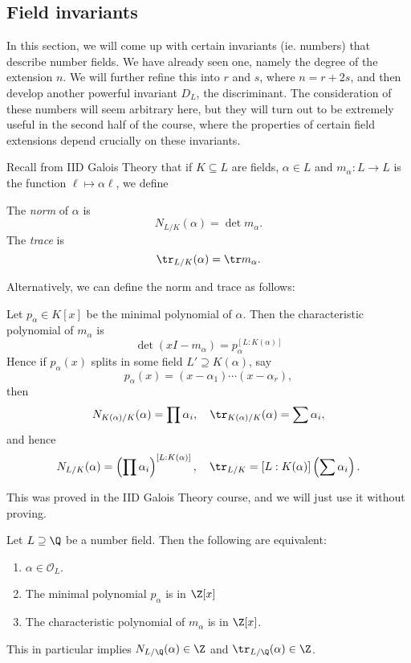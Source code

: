 \documentclass[a4paper]{article}
\begin{document}
\subsection{Field invariants}
In this section, we will come up with certain invariants (ie. numbers) that describe number fields. We have already seen one, namely the degree of the extension $n$. We will further refine this into $r$ and $s$, where $n = r + 2s$, and then develop another powerful invariant $D_L$, the discriminant. The consideration of these numbers will seem arbitrary here, but they will turn out to be extremely useful in the second half of the course, where the properties of certain field extensions depend crucially on these invariants.

Recall from IID Galois Theory that if $K \subseteq L$ are fields, $\alpha \in L$ and $m_\alpha: L \to L$ is the function $\ell \mapsto \alpha \ell$, we define
\begin{defi}
  The \emph{norm} of $\alpha$ is
  \[
    N_{L/K}(\alpha) = \det m_\alpha.
  \]
  The \emph{trace} is
  \[
    \tr_{L/K}(\alpha) = \tr m_\alpha.
  \]
\end{defi}

Alternatively, we can define the norm and trace as follows:
\begin{prop}
  Let $p_\alpha \in K[x]$ be the minimal polynomial of $\alpha$. Then the characteristic polynomial of $m_\alpha$ is
  \[
    \det(xI - m_\alpha) = p_\alpha^{[L:K(\alpha)]}
  \]
  Hence if $p_\alpha(x)$ splits in some field $L'\supseteq K(\alpha)$, say
  \[
    p_\alpha(x) = (x - \alpha_1) \cdots (x - \alpha_r),
  \]
  then
  \[
    N_{K(\alpha)/K}(\alpha) = \prod \alpha_i,\quad \tr_{K(\alpha)/K}(\alpha) = \sum \alpha_i,
  \]
  and hence
  \[
    N_{L/K}(\alpha) = \left(\prod \alpha_i\right)^{[L:K(\alpha)]},\quad \tr_{L/K} = [L:K(\alpha)] \left(\sum \alpha_i\right).
  \]
\end{prop}
This was proved in the IID Galois Theory course, and we will just use it without proving.

\begin{prop}
  Let $L \supseteq \Q$ be a number field. Then the following are equivalent:
  \begin{enumerate}
    \item $\alpha \in \mathcal{O}_L$.
    \item The minimal polynomial $p_\alpha$ is in $\Z[x]$
    \item The characteristic polynomial of $m_\alpha$ is in $\Z[x]$.
  \end{enumerate}
  This in particular implies $N_{L/\Q}(\alpha) \in \Z$ and $\tr_{L/\Q}(\alpha) \in \Z$.
\end{prop}
\end{document}
